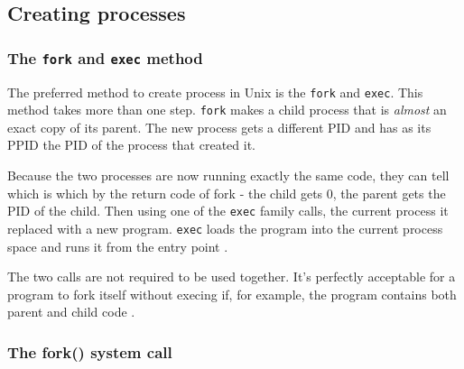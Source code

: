 \documentclass[a4paper]{article}
\begin{document}
\subsection{Creating processes}

\subsubsection{The \texttt{fork} and \texttt{exec} method}

The preferred method to create process in Unix is the \texttt{fork} and \texttt{exec}. This method takes more than one step. \texttt{fork} makes a child process that is \textit{almost} an exact copy of its parent. The new process gets a different PID and has as its PPID the PID of the process that created it.

Because the two processes are now running exactly the same code, they can tell which is which by the return code of fork - the child gets 0, the parent gets the PID of the child.   Then using one of the \texttt{exec} family calls, the current process it replaced with a new program. \texttt{exec} loads the program into the current process space and runs it from the entry point \cite{stflowforkexec}.

The two calls are not required to be used together. It's perfectly acceptable for a program to fork itself without execing if, for example, the program contains both parent and child code \cite{stflowforkexec}.




\subsubsection{The fork() system call}
\end{document}
